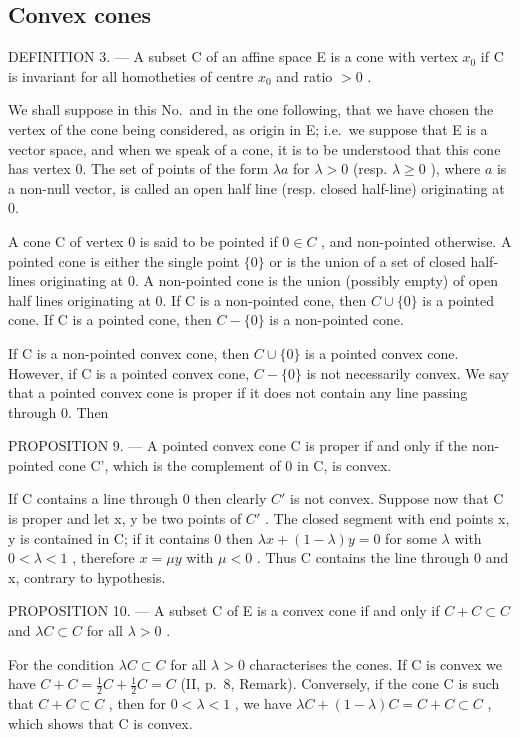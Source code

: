 \subsection{Convex cones}

DEFINITION 3. --- A subset C of an affine space E is a cone with vertex \(x_0\) if C is invariant for all homotheties of centre \(x_0\) and ratio \(> 0\) .

We shall suppose in this No.~and in the one following, that we have chosen the vertex of the cone being considered, as origin in E; i.e.~we suppose that E is a vector space, and when we speak of a cone, it is to be understood that this cone has vertex 0. The set of points of the form \(\lambda a\) for \(\lambda > 0\) (resp. \(\lambda \geqslant 0\) ), where \(a\) is a non-null vector, is called an open half line (resp. closed half-line) originating at 0.

A cone C of vertex 0 is said to be pointed if \(0 \in C\) , and non-pointed otherwise. A pointed cone is either the single point \(\{0\}\) or is the union of a set of closed half-lines originating at 0. A non-pointed cone is the union (possibly empty) of open half lines originating at 0. If C is a non-pointed cone, then \(C \cup \{0\}\) is a pointed cone. If C is a pointed cone, then \(C - \{0\}\) is a non-pointed cone.

If C is a non-pointed convex cone, then \(C \cup \{0\}\) is a pointed convex cone. However, if C is a pointed convex cone, \(C - \{0\}\) is not necessarily convex. We say that a pointed convex cone is proper if it does not contain any line passing through 0. Then

PROPOSITION 9. --- A pointed convex cone C is proper if and only if the non-pointed cone C', which is the complement of 0 in C, is convex.

If C contains a line through 0 then clearly \(C'\) is not convex. Suppose now that C is proper and let x, y be two points of \(C'\) . The closed segment with end points x, y is contained in C; if it contains 0 then \(\lambda x + (1 - \lambda)y = 0\) for some \(\lambda\) with \(0 < \lambda < 1\) , therefore \(x = \mu y\) with \(\mu < 0\) . Thus C contains the line through 0 and x, contrary to hypothesis.

PROPOSITION 10. --- A subset C of E is a convex cone if and only if \(C + C \subset C\) and \(\lambda C \subset C\) for all \(\lambda > 0\) .

For the condition \(\lambda C \subset C\) for all \(\lambda > 0\) characterises the cones. If C is convex we have \(C + C = \frac{1}{2}C + \frac{1}{2}C = C\) (II, p.~8, Remark). Conversely, if the cone C is such that \(C + C \subset C\) , then for \(0 < \lambda < 1\) , we have \(\lambda C + (1 - \lambda)C = C + C \subset C\) , which shows that C is convex.

